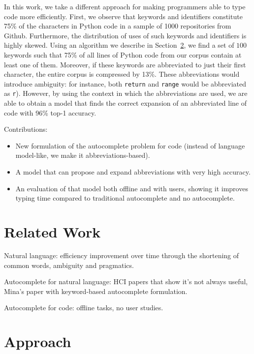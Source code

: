 \documentclass[letterpaper]{article} %
\begin{document}
In this work, we take a different approach for making programmers able to type
code more efficiently. First, we observe that keywords and identifiers
constitute 75\% of the characters in Python code in a sample of 1000 repositories
from Github. Furthermore, the distribution of uses of such keywords and
identifiers is highly skewed. Using an algorithm we describe in
Section~\ref{sec:approach}, we find a set of $100$ keywords such that
75\% of all lines of Python code from our corpus contain at least one of them.
Moreover, if these keywords are abbreviated to just their first character,
the entire corpus is compressed by 13\%.
These abbreviations would introduce ambiguity: for instance, both \texttt{return}
and \texttt{range} would be abbreviated as \texttt{r}).
However, by using the context in which the abbreviations are used,
we are able to obtain a model that finds the correct expansion of an abbreviated
line of code with 96\% top-1 accuracy.

Contributions:

\begin{itemize}
  \item New formulation of the autocomplete problem for code
    (instead of language model-like, we make it abbreviations-based).
  \item A model that can propose and expand abbreviations with very high
    accuracy.
  \item An evaluation of that model both offline and with users, showing it
    improves typing time compared to traditional autocomplete and no autocomplete.
\end{itemize}

\section{Related Work}
\label{sec:rw}

Natural language: efficiency improvement over time through
the shortening of common words, ambiguity and pragmatics.

Autocomplete for natural language: HCI papers that show it's not always useful,
Mina's paper with keyword-based autocomplete formulation.

Autocomplete for code: offline tasks, no user studies.

\section{Approach}
\label{sec:approach}
\end{document}
